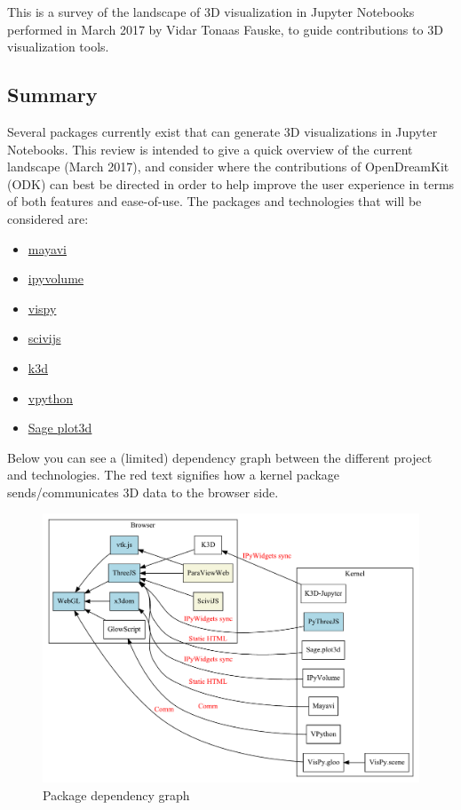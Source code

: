 This is a survey of the landscape of 3D visualization in Jupyter Notebooks
performed in March 2017 by Vidar Tonaas Fauske,
to guide \ODK contributions to 3D visualization tools.

\subsection{Summary}

Several packages currently exist that can generate 3D visualizations in
Jupyter Notebooks. This review is intended to give a quick overview of
the current landscape (March 2017), and consider where the contributions
of OpenDreamKit (ODK) can best be directed in order to help improve the
user experience in terms of both features and ease-of-use. The packages
and technologies that will be considered are:

\begin{itemize}
\tightlist
\item
  \href{http://docs.enthought.com/mayavi/mayavi/tips.html\#using-mayavi-in-jupyter-notebooks}{mayavi}
\item
  \href{https://github.com/maartenbreddels/ipyvolume}{ipyvolume}
\item
  \href{http://vispy.org}{vispy}
\item
  \href{https://www.logilab.org/blogentry/8541176}{scivijs}
\item
  \href{https://github.com/K3D-tools/K3D-jupyter}{k3d}
\item
  \href{http://vpython.org}{vpython}
\item
  \href{http://nbviewer.jupyter.org/github/sagemanifolds/SageManifolds/blob/master/Worksheets/v1.0/SM_sphere_S2.ipynb}{Sage
  plot3d}
\end{itemize}

Below you can see a (limited) dependency graph between the different
project and technologies. The red text signifies how a kernel package
sends/communicates 3D data to the browser side.

\begin{figure}
\centering
\includegraphics[width=0.6\paperwidth]{existing_tools/dependencies.pdf}
\caption{Package dependency graph}
\end{figure}


